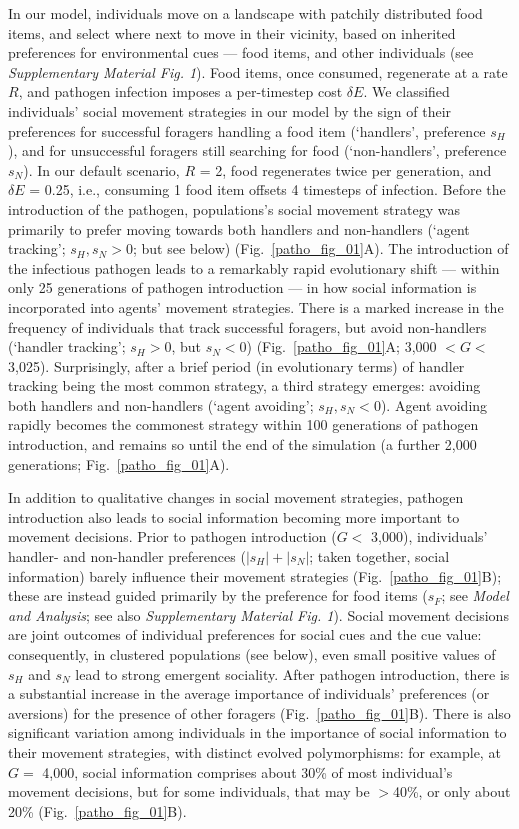 In our model, individuals move on a landscape with patchily distributed food items, and select where next to move in their vicinity, based on inherited preferences for environmental cues --- food items, and other individuals (see \textit{Supplementary Material Fig. 1}).
Food items, once consumed, regenerate at a rate $R$, and pathogen infection imposes a per-timestep cost $\delta E$.
We classified individuals' social movement strategies in our model by the sign of their preferences for successful foragers handling a food item (`handlers', preference $s_H$), and for unsuccessful foragers still searching for food (`non-handlers', preference $s_N$).
In our default scenario, $R$ = 2, food regenerates twice per generation, and $\delta E$ = 0.25, i.e., consuming 1 food item offsets 4 timesteps of infection. 
Before the introduction of the pathogen, populations's social movement strategy was primarily to prefer moving towards both handlers and non-handlers (`agent tracking'; $s_H, s_N > 0$; but see below) (Fig.~\ref{patho_fig_01}A).
The introduction of the infectious pathogen leads to a remarkably rapid evolutionary shift --- within only 25 generations of pathogen introduction --- in how social information is incorporated into agents' movement strategies.
There is a marked increase in the frequency of individuals that track successful foragers, but avoid non-handlers (`handler tracking'; $s_H > 0$, but $s_N < 0$) (Fig.~\ref{patho_fig_01}A; 3,000 $< G <$ 3,025).
Surprisingly, after a brief period (in evolutionary terms) of handler tracking being the most common strategy, a third strategy emerges: avoiding both handlers and non-handlers (`agent avoiding'; $s_H, s_N < 0$).
Agent avoiding rapidly becomes the commonest strategy within 100 generations of pathogen introduction, and remains so until the end of the simulation (a further 2,000 generations; Fig.~\ref{patho_fig_01}A).

In addition to qualitative changes in social movement strategies, pathogen introduction also leads to social information becoming more important to movement decisions.
Prior to pathogen introduction ($G <$ 3,000), individuals' handler- and non-handler preferences ($|s_H| + |s_N|$; taken together, social information) barely influence their movement strategies (Fig.~\ref{patho_fig_01}B); these are instead guided primarily by the preference for food items ($s_F$; see \textit{Model and Analysis}; see also \textit{Supplementary Material Fig. 1}).
Social movement decisions are joint outcomes of individual preferences for social cues and the cue value: consequently, in clustered populations (see below), even small positive values of $s_H$ and $s_N$ lead to strong emergent sociality.
After pathogen introduction, there is a substantial increase in the average importance of individuals' preferences (or aversions) for the presence of other foragers (Fig.~\ref{patho_fig_01}B).
There is also significant variation among individuals in the importance of social information to their movement strategies, with distinct evolved polymorphisms: for example, at $G =$ 4,000, social information comprises about 30\% of most individual's movement decisions, but for some individuals, that may be $>$40\%, or only about 20\% (Fig.~\ref{patho_fig_01}B).

